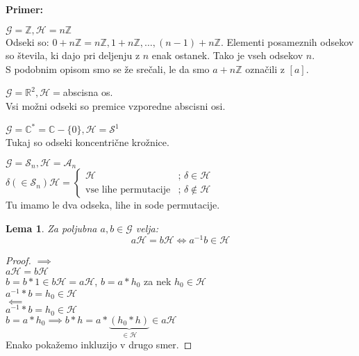 \documentclass[a4paper]{article}
\newcounter{environment:definition_counter}
\newcounter{environment:theorem_counter}
\newcounter{environment:statement_counter}
\newcounter{example:example_counter}
\newenvironment{example}
{\textbf{Primer:}\\}
{\setcounter{example:example_counter}{0}}
\newenvironment{example_case}
{\refstepcounter{example:example_counter} \arabic{example:example_counter}.}
{\\}
\newtheorem{lemma}{Lema}
\newcommand{\twopartdef}[4]
{
	\left\{
		\begin{array}{ll}
			#1 & \mbox{; } #2 \\
			#3 & \mbox{; } #4
		\end{array}
	\right.
}
\begin{document}
\begin{example}
\begin{example_case}
$\mathcal{G} = \mathbb{Z}, \mathcal{H} = n\mathbb{Z}$\\
Odseki so: $0 + n\mathbb{Z} = n\mathbb{Z}, 1 + n\mathbb{Z}, \dots, (n-1) + n \mathbb{Z}$. Elementi posameznih odsekov so števila, ki dajo pri deljenju z $n$ enak ostanek. Tako je vseh odsekov $n$.\\
S podobnim opisom smo se že srečali, le da smo $a + n\mathbb{Z}$ označili z $[a]$.
\end{example_case}

\begin{example_case}
$\mathcal{G} = \mathbb{R}^2, \mathcal{H}=$abscisna os.\\
Vsi možni odseki so premice vzporedne abscisni osi.
\end{example_case}

\begin{example_case}
$\mathcal{G} = \mathbb{C}^* = \mathbb{C}-\{0\}, \mathcal{H}=\mathcal{S}^1$\\
Tukaj so odseki koncentrične krožnice.
\end{example_case}

\begin{example_case}
$\mathcal{G} = \mathcal{S}_n, \mathcal{H}=\mathcal{A}_n$\\
$\delta (\in \mathcal{S}_n) \mathcal{H} = \twopartdef{\mathcal{H}}{\delta \in \mathcal{H}}{\text{vse lihe permutacije}}{\delta \notin \mathcal{H}}$\\
Tu imamo le dva odseka, lihe in sode permutacije.
\end{example_case}

\begin{lemma}
\label{lem:coset_representation}
Za poljubna $a,b \in \mathcal{G}$ velja:
$$a\mathcal{H} = b\mathcal{H} \iff a^{-1} b \in \mathcal{H}$$
\end{lemma}

\begin{proof}
$\implies$\\
$a \mathcal{H} = b \mathcal{H}$\\
$b = b*1 \in b\mathcal{H} = a\mathcal{H}$, $b = a*h_0$ za nek $h_0 \in \mathcal{H}$\\
$a^{-1}*b = h_0 \in \mathcal{H}$ \\
$\impliedby$\\
$a^{-1}*b =h_0 \in \mathcal{H}$\\
$b = a*h_0 \implies b*h = a*\underbrace{(h_0*h)}_{\in \mathcal{H}} \in a\mathcal{H}$\\
Enako pokažemo inkluzijo v drugo smer.
\end{proof}


\end{example}
\end{document}

